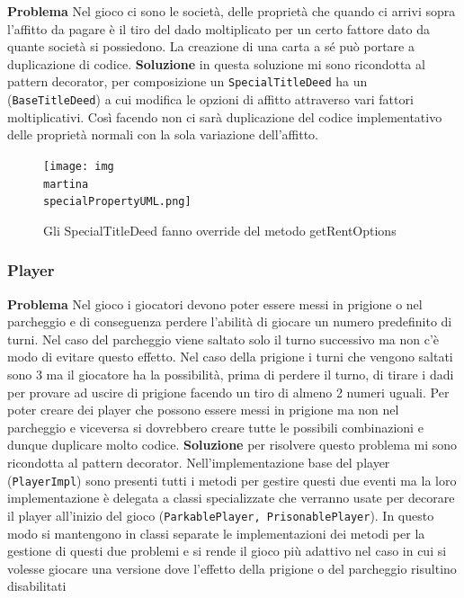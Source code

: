\textbf{Problema}\newline
Nel gioco ci sono le società, delle proprietà che quando ci arrivi sopra l’affitto da pagare è il tiro del dado moltiplicato per un certo fattore dato da quante società si possiedono. 
La creazione di una carta a sé può portare a duplicazione di codice. 
\newline\newline
\textbf{Soluzione}\newline
in questa soluzione mi sono ricondotta al pattern decorator, per composizione un \texttt{SpecialTitleDeed} ha un (\texttt{BaseTitleDeed}) a cui modifica le opzioni di affitto attraverso vari fattori moltiplicativi.
Così facendo non ci sarà duplicazione del codice implementativo delle proprietà normali con la sola variazione dell'affitto.
\begin{figure}[h]
    \centering
    \texttt{[image: img\\martina\\specialPropertyUML.png]}
    \caption{Gli SpecialTitleDeed fanno override del metodo getRentOptions}
    \label{img:specialPropertyUML}
\end{figure}

\newline

\subsubsection{Player}

\textbf{Problema}\newline
Nel gioco i giocatori devono poter essere messi in prigione o nel parcheggio e di conseguenza perdere l’abilità di giocare un numero predefinito di turni. 
Nel caso del parcheggio viene saltato solo il turno successivo ma non c’è modo di evitare questo effetto.
Nel caso della prigione i turni che vengono saltati sono 3 ma il giocatore ha la possibilità, prima di perdere il turno, di tirare i dadi per provare ad uscire di prigione facendo un tiro di almeno 2 numeri uguali.
Per poter creare dei player che possono essere messi in prigione ma non nel parcheggio e viceversa si dovrebbero creare tutte le possibili combinazioni e dunque duplicare molto codice.
\newline\newline
\textbf{Soluzione}\newline
per risolvere questo problema mi sono ricondotta al pattern decorator. 
Nell'implementazione base del player (\texttt{PlayerImpl}) sono presenti tutti i metodi per gestire questi due eventi ma la loro implementazione è delegata a classi specializzate che verranno usate per decorare il player all’inizio del gioco (\texttt{ParkablePlayer, PrisonablePlayer}). 
In questo modo si mantengono in classi separate le implementazioni dei metodi per la gestione di questi due problemi e si rende il gioco più adattivo nel caso in cui si volesse giocare una versione dove l’effetto della prigione o del parcheggio risultino disabilitati

